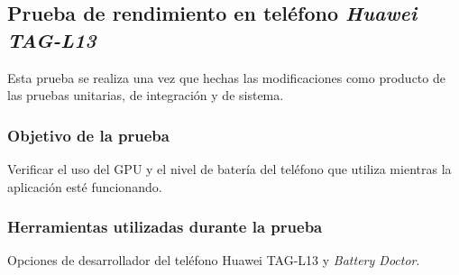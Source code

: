 \subsection{Prueba de rendimiento en teléfono \textit{Huawei TAG-L13}}
Esta prueba se realiza una vez que hechas las modificaciones como producto de las pruebas unitarias, de integración y de sistema.
\subsubsection{Objetivo de la prueba}
Verificar el uso del GPU y el nivel de batería del teléfono que utiliza mientras la aplicación esté funcionando.
\subsubsection{Herramientas utilizadas durante la prueba}
Opciones de desarrollador del teléfono Huawei TAG-L13 y \textit{Battery Doctor}.

